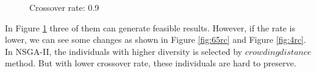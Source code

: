 \documentclass[a4paper, 11pt]{article}
\begin{document}
\begin{figure}[htb]
    \begin{center}
    \end{center}
    \caption{Crossover rate: 0.9}\label{fig:9cr}
\end{figure}
\begin{flushleft}
In Figure \ref{fig:9cr} three of them can generate feasible results.
However, if the rate is lower, we can see some changes as shown in Figure \ref{fig:65rc} and Figure \ref{fig:4rc}.
In NSGA-II, the individuals with higher diversity is selected by $crowding distance$ method. But with lower crossover rate,
these individuals are hard to preserve.
\end{flushleft}
\clearpage
\end{document}
